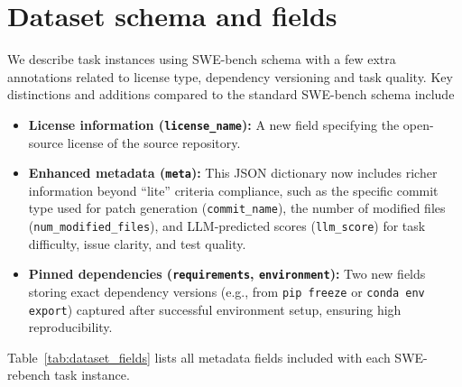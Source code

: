 \documentclass[dandb]{article}
\begin{document}
\section{Dataset schema and fields}
\label{appendix:dataset_schema}

We describe task instances using SWE-bench schema with a few extra annotations related to license type, dependency versioning and task quality. Key distinctions and additions compared to the standard SWE-bench schema include

\begin{itemize}
    \item \textbf{License information (\texttt{license\_name}):} A new field specifying the open-source license of the source repository.
    \item \textbf{Enhanced metadata (\texttt{meta}):} This JSON dictionary now includes richer information beyond ``lite'' criteria compliance, such as the specific commit type used for patch generation (\texttt{commit\_name}), the number of modified files (\texttt{num\_modified\_files}), and LLM-predicted scores (\texttt{llm\_score}) for task difficulty, issue clarity, and test quality.
    \item \textbf{Pinned dependencies (\texttt{requirements}, \texttt{environment}):} Two new fields storing exact dependency versions (e.g., from \texttt{pip freeze} or \texttt{conda env export}) captured after successful environment setup, ensuring high reproducibility.
\end{itemize}

Table~\ref{tab:dataset_fields} lists all metadata fields included with each SWE-rebench task instance.
\end{document}
